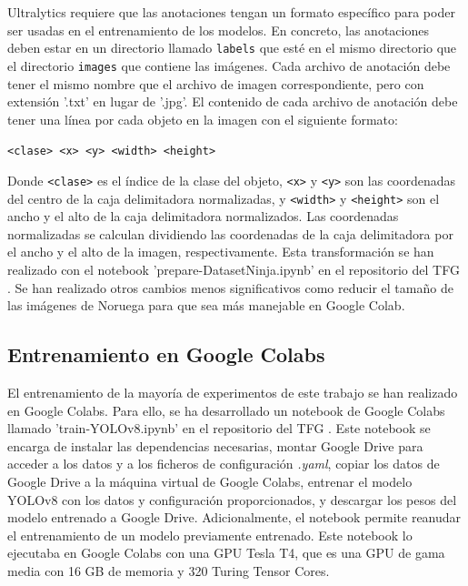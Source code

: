 Ultralytics requiere que las anotaciones tengan un formato específico para poder ser usadas en el entrenamiento de los modelos. En concreto, las anotaciones deben estar en un directorio llamado \texttt{labels} que esté en el mismo directorio que el directorio \texttt{images} que contiene las imágenes. Cada archivo de anotación debe tener el mismo nombre que el archivo de imagen correspondiente, pero con extensión '.txt' en lugar de '.jpg'. El contenido de cada archivo de anotación debe tener una línea por cada objeto en la imagen con el siguiente formato:
\begin{center}
    \texttt{<clase> <x> <y> <width> <height>}
\end{center}
Donde \texttt{<clase>} es el índice de la clase del objeto, \texttt{<x>} y \texttt{<y>} son las coordenadas del centro de la caja delimitadora normalizadas, y \texttt{<width>} y \texttt{<height>} son el ancho y el alto de la caja delimitadora normalizados. Las coordenadas normalizadas se calculan dividiendo las coordenadas de la caja delimitadora por el ancho y el alto de la imagen, respectivamente. Esta transformación se han realizado con el notebook 'prepare-DatasetNinja.ipynb' en el repositorio del TFG \cite{TFG_Repository}. Se han realizado otros cambios menos significativos como reducir el tamaño de las imágenes de Noruega para que sea más manejable en Google Colab.

\subsection{Entrenamiento en Google Colabs}
El entrenamiento de la mayoría de experimentos de este trabajo se han realizado en Google Colabs. Para ello, se ha desarrollado un notebook de Google Colabs llamado 'train-YOLOv8.ipynb' en el repositorio del TFG \cite{TFG_Repository}. Este notebook se encarga de instalar las dependencias necesarias, montar Google Drive para acceder a los datos y a los ficheros de configuración \textit{.yaml}, copiar los datos de Google Drive a la máquina virtual de Google Colabs, entrenar el modelo YOLOv8 con los datos y configuración proporcionados, y descargar los pesos del modelo entrenado a Google Drive. Adicionalmente, el notebook permite reanudar el entrenamiento de un modelo previamente entrenado. Este notebook lo ejecutaba en Google Colabs con una GPU Tesla T4, que es una GPU de gama media con 16 GB de memoria y 320 Turing Tensor Cores.


